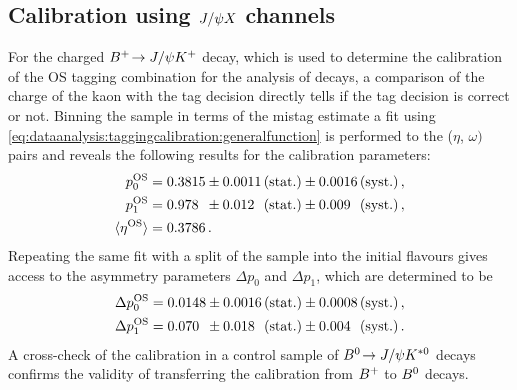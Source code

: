
\subsection{Calibration using \texorpdfstring{$J/\psi X$}{JpsiX} channels}
\label{sec:dataanalysis:taggingcalibration:jpsixcalibration}

For the charged ${{B}^+}\!\rightarrow J/\psi{\ensuremath{{K}^+}}$ decay, which is used to determine the calibration
of the OS tagging combination for the analysis of \BdToJPsiKS decays, a
comparison of the charge of the kaon with the tag decision directly tells if
the tag decision is correct or not. Binning the sample in terms of the mistag
estimate a \chisq fit using
\cref{eq:dataanalysis:taggingcalibration:generalfunction} is performed to the
($\eta$, $\omega)$ pairs and reveals the following results for the calibration
parameters:
\begin{equation}
\begin{aligned}
  p_0^{\text{OS}} &= 0.3815 \pm 0.0011 \text{\,(stat.)}
                            \pm 0.0016 \text{\,(syst.)} \, ,\\
  p_1^{\text{OS}} &= 0.978\phantom{0} \pm 0.012\phantom{0} \text{\,(stat.)}
                                      \pm 0.009\phantom{0} \text{\,(syst.)} \, ,\\
  \langle\eta^{\text{OS}}\rangle &= 0.3786 \, .
\end{aligned}
\label{eq:dataanalysis:taggingcalibration:jpsixcalibration:os_calibration_pars}
\end{equation}
Repeating the same fit with a split of the sample into the initial flavours
gives access to the asymmetry parameters $\Delta p_0$ and $\Delta p_1$, which
are determined to be
\begin{equation}
\begin{split}
  \Delta p_0^{\text{OS}} &= 0.0148 \pm 0.0016 \text{\,(stat.)} \pm  0.0008 \text{\,(syst.)} \, , \\
  \Delta p_1^{\text{OS}} &= 0.070\phantom{0} \pm 0.018\phantom{0} \text{\,(stat.)} \pm 0.004\phantom{0} \text{\,(syst.)} \,.
\end{split}
\label{eq:dataanalysis:taggingcalibration:jpsixcalibration:os_calibration_asymmetries}
\end{equation}
A cross-check of the calibration in a control sample of ${{B}^0}\!\rightarrow J/\psi{\ensuremath{{K}^{*0}}}$
decays confirms the validity of transferring the calibration from ${{B}^+}$ to
${{B}^0}$ decays.


